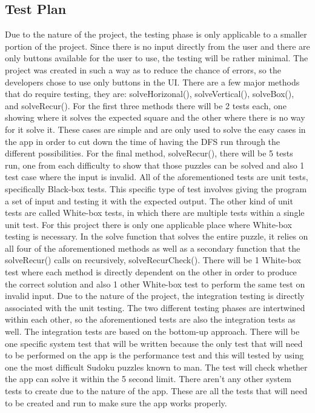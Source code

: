 \documentclass{article}
\begin{document}
\subsection{Test Plan}
Due to the nature of the project, the testing phase is only applicable to a smaller portion of the project. Since there is no input directly from the user and there are only buttons available for the user to use, the testing will be rather minimal. The project was created in such a way as to reduce the chance of errors, so the developers chose to use only buttons in the UI. There are a few major methods that do require testing, they are: solveHorizonal(), solveVertical(), solveBox(), and solveRecur(). For the first three methods there will be 2 tests each, one showing where it solves the expected square and the other where there is no way for it solve it. These cases are simple and are only used to solve the easy cases in the app in order to cut down the time of having the DFS run through the different possibilities. For the final method, solveRecur(), there will be 5 tests run, one from each difficulty to show that those puzzles can be solved and also 1 test case where the input is invalid. All of the aforementioned tests are unit tests, specifically Black-box tests. This specific type of test involves giving the program a set of input and testing it with the expected output. The other kind of unit tests are called White-box tests, in which there are multiple tests within a single unit test. For this project there is only one applicable place where White-box testing is necessary. In the solve function that solves the entire puzzle, it relies on all four of the aforementioned methods as well as a secondary function that the solveRecur() calls on recursively, solveRecurCheck(). There will be 1 White-box test where each method is directly dependent on the other in order to produce the correct solution and also 1 other White-box test to perform the same test on invalid input. Due to the nature of the project, the integration testing is directly associated with the unit testing. The two different testing phases are intertwined within each other, so the aforementioned tests are also the integration tests as well. The integration tests are based on the bottom-up approach. There will be one specific system test that will be written because the only test that will need to be performed on the app is the performance test and this will tested by using one the most difficult Sudoku puzzles known to man. The test will check whether the app can solve it within the 5 second limit. There aren't any other system tests to create due to the nature of the app. These are all the tests that will need to be created and run to make sure the app works properly.
\end{document}
